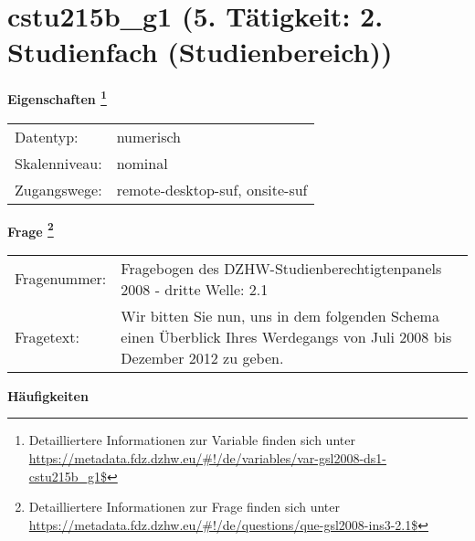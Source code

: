 
    \setcounter{footnote}{0}

    \vspace*{-1.8cm}
	\section{cstu215b\_g1 (5. Tätigkeit: 2. Studienfach (Studienbereich))}
	\label{section:cstu215b_g1}



    \vspace*{0.5cm}
    \noindent\textbf{Eigenschaften
	\footnote{Detailliertere Informationen zur Variable finden sich unter
		\url{https://metadata.fdz.dzhw.eu/\#!/de/variables/var-gsl2008-ds1-cstu215b_g1$}}}\\
	\begin{tabularx}{\hsize}{@{}lX}
	Datentyp: & numerisch \\
	Skalenniveau: & nominal \\
	Zugangswege: &
	  remote-desktop-suf, 
	  onsite-suf
 \\
    \end{tabularx}



				\vspace*{0.5cm}
                \noindent\textbf{Frage
	                \footnote{Detailliertere Informationen zur Frage finden sich unter
		              \url{https://metadata.fdz.dzhw.eu/\#!/de/questions/que-gsl2008-ins3-2.1$}}}\\
				\begin{tabularx}{\hsize}{@{}lX}
					Fragenummer: &
					  Fragebogen des DZHW-Studienberechtigtenpanels 2008 - dritte Welle:
					  2.1
 \\
					Fragetext: & Wir bitten Sie nun, uns in dem folgenden Schema einen Überblick Ihres Werdegangs von Juli 2008 bis Dezember 2012 zu geben. \\
				\end{tabularx}





        		\vspace*{0.5cm}
                \noindent\textbf{Häufigkeiten}


